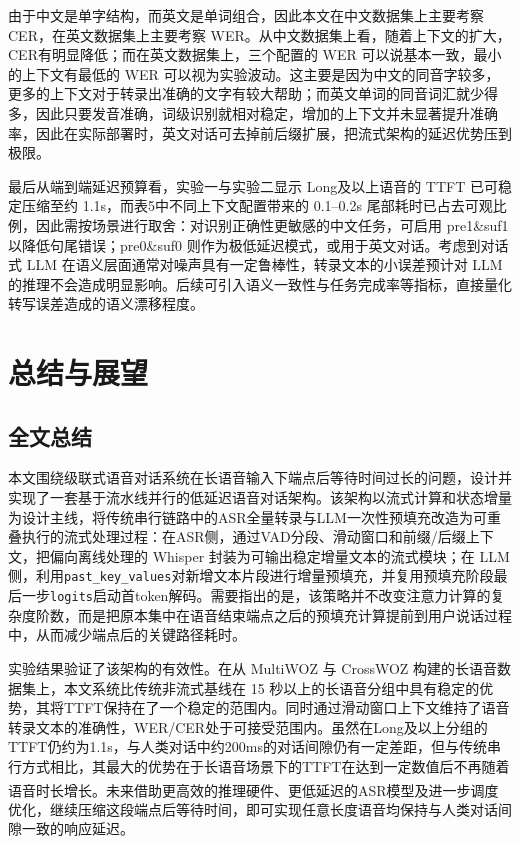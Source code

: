 \documentclass[UTF8,a4paper,zihao=5]{ctexart}
\newcommand{\upcite}[1]{\textsuperscript{\cite{#1}}}
\begin{document}
由于中文是单字结构，而英文是单词组合，因此本文在中文数据集上主要考察 CER，在英文数据集上主要考察 WER。从中文数据集上看，随着上下文的扩大，CER有明显降低；而在英文数据集上，三个配置的 WER 可以说基本一致，最小的上下文有最低的 WER 可以视为实验波动。这主要是因为中文的同音字较多，更多的上下文对于转录出准确的文字有较大帮助；而英文单词的同音词汇就少得多，因此只要发音准确，词级识别就相对稳定，增加的上下文并未显著提升准确率，因此在实际部署时，英文对话可去掉前后缀扩展，把流式架构的延迟优势压到极限。

最后从端到端延迟预算看，实验一与实验二显示 Long及以上语音的 TTFT 已可稳定压缩至约 1.1s，而表5中不同上下文配置带来的 0.1--0.2s 尾部耗时已占去可观比例，因此需按场景进行取舍：对识别正确性更敏感的中文任务，可启用 pre1\&suf1 以降低句尾错误；pre0\&suf0 则作为极低延迟模式，或用于英文对话。考虑到对话式 LLM 在语义层面通常对噪声具有一定鲁棒性，转录文本的小误差预计对 LLM 的推理不会造成明显影响。后续可引入语义一致性与任务完成率等指标，直接量化转写误差造成的语义漂移程度。

\section{总结与展望}

\subsection{全文总结}

本文围绕级联式语音对话系统在长语音输入下端点后等待时间过长的问题，设计并实现了一套基于流水线并行的低延迟语音对话架构。该架构以流式计算和状态增量为设计主线，将传统串行链路中的ASR全量转录与LLM一次性预填充改造为可重叠执行的流式处理过程：在ASR侧，通过VAD分段、滑动窗口和前缀/后缀上下文，把偏向离线处理的 Whisper 封装为可输出稳定增量文本的流式模块；在 LLM 侧，利用\texttt{past\_key\_values}对新增文本片段进行增量预填充，并复用预填充阶段最后一步\texttt{logits}启动首token解码。需要指出的是，该策略并不改变注意力计算的复杂度阶数，而是把原本集中在语音结束端点之后的预填充计算提前到用户说话过程中，从而减少端点后的关键路径耗时。

实验结果验证了该架构的有效性。在从 MultiWOZ 与 CrossWOZ 构建的长语音数据集上，本文系统比传统非流式基线在 15 秒以上的长语音分组中具有稳定的优势，其将TTFT保持在了一个稳定的范围内。同时通过滑动窗口上下文维持了语音转录文本的准确性，WER/CER处于可接受范围内。虽然在Long及以上分组的TTFT仍约为1.1s，与人类对话中约200ms的对话间隙仍有一定差距，但与传统串行方式相比，其最大的优势在于长语音场景下的TTFT在达到一定数值后不再随着语音时长增长\upcite{ref21}。未来借助更高效的推理硬件、更低延迟的ASR模型及进一步调度优化，继续压缩这段端点后等待时间，即可实现任意长度语音均保持与人类对话间隙一致的响应延迟。
\end{document}
